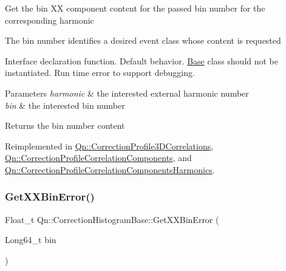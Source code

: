 Get the bin XX component content for the passed bin number for the corresponding harmonic

The bin number identifies a desired event class whose content is requested

Interface declaration function. Default behavior. \mbox{\hyperlink{classBase}{Base}} class should not be instantiated. Run time error to support debugging.


\begin{DoxyParams}{Parameters}
{\em harmonic} & the interested external harmonic number \\
\hline
{\em bin} & the interested bin number \\
\hline
\end{DoxyParams}
\begin{DoxyReturn}{Returns}
the bin number content 
\end{DoxyReturn}


Reimplemented in \mbox{\hyperlink{classQn_1_1CorrectionProfile3DCorrelations_a36e3cae66cf3f957b5e92a78b45aea6a}{Qn\+::\+Correction\+Profile3\+D\+Correlations}}, \mbox{\hyperlink{classQn_1_1CorrectionProfileCorrelationComponents_a7db7b8e5a7a11b91de593ed60c9ed84a}{Qn\+::\+Correction\+Profile\+Correlation\+Components}}, and \mbox{\hyperlink{classQn_1_1CorrectionProfileCorrelationComponentsHarmonics_aa48fa859f512dcd7b7e0a7c7ede4bb99}{Qn\+::\+Correction\+Profile\+Correlation\+Components\+Harmonics}}.

\mbox{\label{classQn_1_1CorrectionHistogramBase_ae7b4e0bfb45e52cc7050eefc78c5230e}} 
\subsubsection{\texorpdfstring{Get\+X\+X\+Bin\+Error()}{GetXXBinError()}\hspace{0.1cm}{\footnotesize\ttfamily [1/2]}}
{\footnotesize\ttfamily Float\+\_\+t Qn\+::\+Correction\+Histogram\+Base\+::\+Get\+X\+X\+Bin\+Error (\begin{DoxyParamCaption}\item[{Long64\+\_\+t}]{bin }\end{DoxyParamCaption})\hspace{0.3cm}{\ttfamily [virtual]}}

